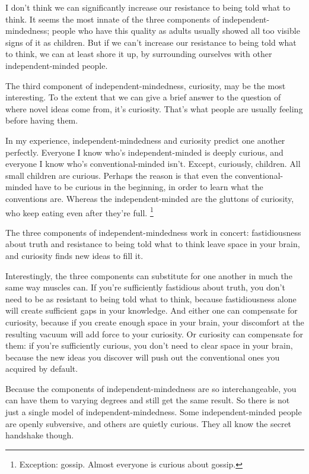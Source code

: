 I don't think we can significantly increase our resistance to being told
what to think. It seems the most innate of the three components of
independent-mindedness; people who have this quality as adults usually
showed all too visible signs of it as children. But if we can't increase
our resistance to being told what to think, we can at least shore it up,
by surrounding ourselves with other independent-minded people.

The third component of independent-mindedness, curiosity, may be the
most interesting. To the extent that we can give a brief answer to the
question of where novel ideas come from, it's curiosity. That's what
people are usually feeling before having them.

In my experience, independent-mindedness and curiosity predict one
another perfectly. Everyone I know who's independent-minded is deeply
curious, and everyone I know who's conventional-minded isn't. Except,
curiously, children. All small children are curious. Perhaps the reason
is that even the conventional-minded have to be curious in the
beginning, in order to learn what the conventions are. Whereas the
independent-minded are the gluttons of curiosity, who keep eating even
after they're full. \footnote{Exception: gossip. Almost everyone is curious about gossip.}

The three components of independent-mindedness work in concert:
fastidiousness about truth and resistance to being told what to think
leave space in your brain, and curiosity finds new ideas to fill it.

Interestingly, the three components can substitute for one another in
much the same way muscles can. If you're sufficiently fastidious about
truth, you don't need to be as resistant to being told what to think,
because fastidiousness alone will create sufficient gaps in your
knowledge. And either one can compensate for curiosity, because if you
create enough space in your brain, your discomfort at the resulting
vacuum will add force to your curiosity. Or curiosity can compensate for
them: if you're sufficiently curious, you don't need to clear space in
your brain, because the new ideas you discover will push out the
conventional ones you acquired by default.

Because the components of independent-mindedness are so interchangeable,
you can have them to varying degrees and still get the same result. So
there is not just a single model of independent-mindedness. Some
independent-minded people are openly subversive, and others are quietly
curious. They all know the secret handshake though.

